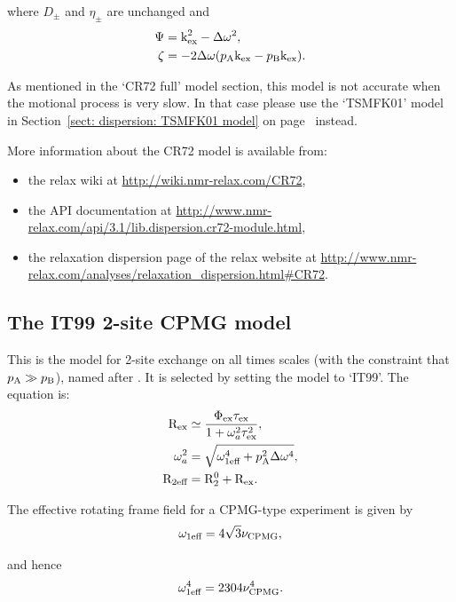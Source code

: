 where $D_\pm$ and $\eta_\pm$ are unchanged and
\begin{align}
    \Psi  &= \textrm{k}_\textrm{ex}^2 - \Delta\omega^2 , \\
    \zeta &= -2\Delta\omega (p_\textrm{A}\textrm{k}_\textrm{ex} - p_\textrm{B}\textrm{k}_\textrm{ex}) .
\end{align}

As mentioned in the `CR72 full' model section, this model is not accurate when the motional process is very slow.
In that case please use the `TSMFK01' model in Section~\ref{sect: dispersion: TSMFK01 model} on page~\pageref{sect: dispersion: TSMFK01 model} instead.

More information about the CR72 model is available from:
\begin{itemize}
  \item the relax wiki at \url{http://wiki.nmr-relax.com/CR72},
  \item the API documentation at \url{http://www.nmr-relax.com/api/3.1/lib.dispersion.cr72-module.html},
  \item the relaxation dispersion page of the relax website at \url{http://www.nmr-relax.com/analyses/relaxation\_dispersion.html#CR72}.
\end{itemize}



\subsection{The IT99 2-site CPMG model}
\label{sect: dispersion: IT99 model}

This is the model for 2-site exchange on all times scales (with the constraint that $p_\textrm{A} \gg p_\textrm{B}$), named after \citet{IshimaTorchia99}.
It is selected by setting the model to `IT99'.
The equation is:
\begin{align}
    \mathrm{R}_\textrm{ex}       &\simeq \frac{\Phi_\textrm{ex}\tau_\textrm{ex}}{1 + \omega_a^2\tau_\textrm{ex}^2} , \\
    \omega_a^2 &= \sqrt{\omega_\textrm{1eff}^4 + p_\textrm{A}^2\Delta\omega^4} , \\
    \mathrm{R}_\textrm{2eff}   &= \mathrm{R}_2^0 + \mathrm{R}_\textrm{ex} .
\end{align}

The effective rotating frame field for a CPMG-type experiment is given by
\begin{equation}
    \omega_\textrm{1eff} = 4\sqrt{3}\nu_\textrm{CPMG} ,
\end{equation}

and hence
\begin{equation}
    \omega_\textrm{1eff}^4 = 2304\nu_\textrm{CPMG}^4 .
\end{equation}

